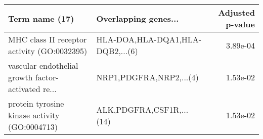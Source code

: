 \begin{tabular}{llr}
\toprule
                                    Term name (17) &             Overlapping genes... &  Adjusted p-value \\
\midrule
       MHC class II receptor activity (GO:0032395) & HLA-DOA,HLA-DQA1,HLA-DQB2,...(6) &          3.89e-04 \\
vascular endothelial growth factor-activated re... &          NRP1,PDGFRA,NRP2,...(4) &          1.53e-02 \\
     protein tyrosine kinase activity (GO:0004713) &         ALK,PDGFRA,CSF1R,...(14) &          1.53e-02 \\
\bottomrule
\end{tabular}
